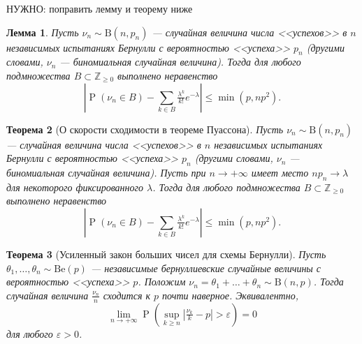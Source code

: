 \documentclass[12pt]{article}
\newtheorem{theorem}{Теорема}
\newtheorem{lemma}[theorem]{Лемма}
\numberwithin{theorem}{section}
\theoremstyle{definition}
\newcommand{\prob}{\operatorname{P}}
\newcommand{\TODO}[1]{\textcolor{todocolor}{НУЖНО: #1}}
\begin{document}
	\TODO{поправить лемму и теорему ниже}
	
	\begin{lemma}
		Пусть $ \nu_n \sim \mathrm{B}(n, p_n) $ --- случайная величина числа <<успехов>> в $ n $ независимых испытаниях Бернулли
		с вероятностью <<успеха>> $ p_n $ (другими словами, $ \nu_n $ --- биномиальная случайная величина).
		Тогда для любого подмножества $ B \subset \mathbb{Z}_{\geqslant 0} $ выполнено неравенство
		$$ \left|\prob(\nu_n \in B) - \sum\limits_{k \in B}\tfrac{\lambda^k}{k!}e^{-\lambda}\right| \leqslant \min(p, np^2). $$
	\end{lemma}
	
	\begin{theorem}[О скорости сходимости в теореме Пуассона] 
		Пусть $ \nu_n \sim \mathrm{B}(n, p_n) $ --- случайная величина числа <<успехов>> в $ n $ независимых испытаниях Бернулли
		с вероятностью <<успеха>> $ p_n $ (другими словами, $ \nu_n $ --- биномиальная случайная величина).
		Пусть при $ n \to +\infty $ имеет место $ np_n \to \lambda $ для некоторого фиксированного $ \lambda $.
		Тогда для любого подмножества $ B \subset \mathbb{Z}_{\geqslant 0} $ выполнено неравенство
		$$ \left|\prob(\nu_n \in B) - \sum\limits_{k \in B}\tfrac{\lambda^k}{k!}e^{-\lambda}\right| \leqslant \min(p, np^2). $$
	\end{theorem}
	
	\begin{theorem}[Усиленный закон больших чисел для схемы Бернулли] \label{large numbers law | Bernoulli}
		Пусть $ \theta_1, \ldots, \theta_n \sim \mathrm{Be}(p) $ --- независимые бернуллиевские случайные величины
		с вероятностью <<успеха>> $ p $. Положим $ \nu_n = \theta_1 + \ldots + \theta_n \sim \mathrm{B}(n, p) $.
		Тогда случайная величина $ \tfrac{\nu_n}{n} $ сходится к $ p $ почти наверное.
		Эквивалентно,
		$$ \lim\limits_{n \to +\infty} 
		\prob(\sup\limits_{k \geqslant n} \left|\tfrac{\nu_k}{k} - p\right| > \varepsilon) = 0 $$
		для любого $ \varepsilon > 0 $.
	\end{theorem}
	
\end{document}

